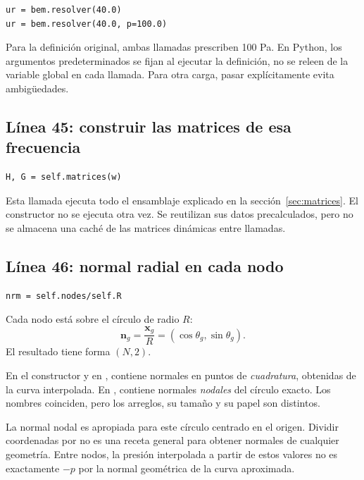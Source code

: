 \documentclass[11pt,a4paper]{article}
\numberwithin{equation}{section}
\newcommand{\vect}[1]{\bm{#1}}
\DeclareRobustCommand{\code}[1]{\texttt{\detokenize{#1}}}
\begin{document}
\begin{lstlisting}
ur = bem.resolver(40.0)
ur = bem.resolver(40.0, p=100.0)
\end{lstlisting}
Para la definici\'on original, ambas llamadas prescriben 100 Pa.
En Python, los argumentos predeterminados se fijan al ejecutar la
definici\'on, no se releen de la variable global en cada llamada.
Para otra carga, pasar \code{p} expl\'icitamente evita ambig\"uedades.

\subsection{L\'inea 45: construir las matrices de esa frecuencia}
\begin{lstlisting}
H, G = self.matrices(w)
\end{lstlisting}
Esta llamada ejecuta todo el ensamblaje explicado en la
secci\'on~\ref{sec:matrices}. El constructor no se ejecuta otra vez.
Se reutilizan sus datos precalculados, pero no se almacena una cach\'e
de las matrices din\'amicas entre llamadas.

\subsection{L\'inea 46: normal radial en cada nodo}
\begin{lstlisting}
nrm = self.nodes/self.R
\end{lstlisting}
Cada nodo est\'a sobre el c\'irculo de radio $R$:
\begin{equation}
 \vect n_g=\frac{\vect x_g}{R}
          =(\cos\theta_g,\sin\theta_g).
\end{equation}
El resultado tiene forma $(N,2)$.

\begin{cuidado}
En el constructor y en \code{matrices}, \code{nrm} contiene normales
en puntos de \emph{cuadratura}, obtenidas de la curva interpolada.
En \code{resolver}, contiene normales \emph{nodales} del c\'irculo exacto.
Los nombres coinciden, pero los arreglos, su tama\~no y su papel son distintos.
\end{cuidado}

La normal nodal es apropiada para este c\'irculo centrado en el origen.
Dividir coordenadas por \code{R} no es una receta general para obtener
normales de cualquier geometr\'ia.
Entre nodos, la presi\'on interpolada a partir de estos valores no es
exactamente $-p$ por la normal geom\'etrica de la curva aproximada.
\end{document}
